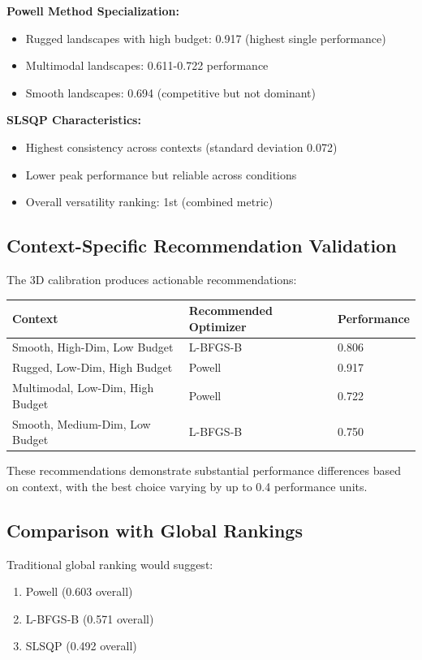 \documentclass[article]{jss}
\begin{document}
\textbf{Powell Method Specialization:}
\begin{itemize}
\item Rugged landscapes with high budget: 0.917 (highest single performance)
\item Multimodal landscapes: 0.611-0.722 performance
\item Smooth landscapes: 0.694 (competitive but not dominant)
\end{itemize}

\textbf{SLSQP Characteristics:}
\begin{itemize}
\item Highest consistency across contexts (standard deviation 0.072)
\item Lower peak performance but reliable across conditions
\item Overall versatility ranking: 1st (combined metric)
\end{itemize}

\subsection{Context-Specific Recommendation Validation}

The 3D calibration produces actionable recommendations:

\begin{center}
\begin{tabular}{lll}
\toprule
Context & Recommended Optimizer & Performance \\
\midrule
Smooth, High-Dim, Low Budget & L-BFGS-B & 0.806 \\
Rugged, Low-Dim, High Budget & Powell & 0.917 \\
Multimodal, Low-Dim, High Budget & Powell & 0.722 \\
Smooth, Medium-Dim, Low Budget & L-BFGS-B & 0.750 \\
\bottomrule
\end{tabular}
\end{center}

These recommendations demonstrate substantial performance differences based on context, with the best choice varying by up to 0.4 performance units.

\subsection{Comparison with Global Rankings}

Traditional global ranking would suggest:
\begin{enumerate}
\item Powell (0.603 overall)
\item L-BFGS-B (0.571 overall)
\item SLSQP (0.492 overall)
\end{enumerate}
\end{document}

